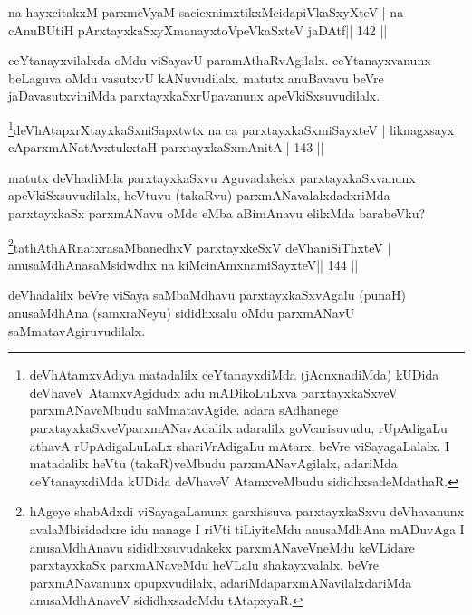 \begin{shl}
na hayxcitakxM parxmeVyaM sacicxnimxtikxMcidapiVkaSxyXteV |
na cAnuBUtiH pArxtayxkaSxyXmanayxtoV\s peVkaSxteV jaDAtf\hfill || 142 ||
\end{shl}

\begin{artha}
ceYtanayxvilalxda oMdu viSayavU paramAthaRvAgilalx. ceYtanayxvanunx  beLaguva oMdu vasutxvU kANuvudilalx. matutx anuBavavu beVre jaDavasutxviniMda parxtayxkaSxrUpavanunx apeVkiSxsuvudilalx.
\end{artha}

\begin{shl}
\footnote{deVhAtamxvAdiya matadalilx ceYtanayxdiMda  (jAcnxnadiMda) kUDida deVhaveV AtamxvAgidudx adu mADikoLuLxva  parxtayxkaSxveV parxmANaveMbudu saMmatavAgide. adara sAdhanege  parxtayxkaSxveV\break parxmANavAdalilx adaralilx goVcarisuvudu, rUpAdigaLu  athavA rUpAdigaLuLaLx shariVrAdigaLu mAtarx, beVre viSayagaLalalx. I matadalilx heVtu (takaR)veMbudu parxmANavAgilalx, adariMda ceYtanayxdiMda kUDida deVhaveV AtamxveMbudu sididhxsadeMdathaR.}deVhAtapxrXtayxkaSxniSapxtwtx na ca parxtayxkaSxmiSayxteV |
liknagxsayx cAparxmANatAvxtukxtaH  parxtayxkaSxmAnitA\hfill || 143 ||
\end{shl}

\begin{artha}
matutx deVhadiMda parxtayxkaSxvu Aguvadakekx parxtayxkaSxvanunx apeVkiSxsuvudilalx, heVtuvu (takaRvu) parxmANavalalxdadxriMda parxtayxkaSx parxmANavu oMde eMba aBimAnavu elilxMda barabeVku?
\end{artha}

\begin{shl}
\footnote{hAgeye shabAdxdi viSayagaLanunx garxhisuva  parxtayxkaSxvu deVhavanunx avalaMbisidadxre idu nanage I riVti  tiLiyiteMdu anusaMdhAna mADuvAga I anusaMdhAnavu sididhxsuvudakekx  parxmANaveVneMdu keVLidare parxtayxkaSx parxmANaveMdu heVLalu shakayxvalalx. beVre parxmANavanunx opupxvudilalx, adariMda\break parxmANavilalxdariMda anusaMdhAnaveV sididhxsadeMdu tAtapxyaR.}tathA\s thARnatxrasaMbanedhxV parxtayxkeSxV deVhaniSiThxteV |
anusaMdhAnasaMsidwdhx na kiMcinAmxnamiSayxteV\hfill || 144 ||
\end{shl}

\begin{artha}
deVhadalilx beVre viSaya saMbaMdhavu parxtayxkaSxvAgalu (punaH) 
anusaMdhAna (samxraNeyu) sididhxsalu oMdu parxmANavU saMmatavAgiruvudilalx. 
\end{artha}

